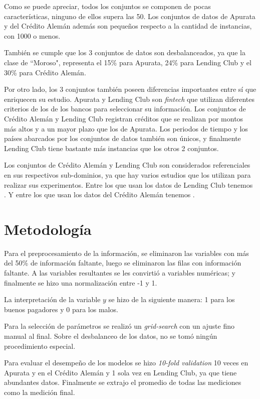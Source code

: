 Como se puede apreciar, todos los conjuntos se componen de pocas características, ninguno de ellos supera las 50. Los conjuntos de datos de Apurata y del Crédito Alemán además son pequeños respecto a la cantidad de instancias, con 1000 o menos.

También se cumple que los 3 conjuntos de datos son desbalanceados, ya que la clase de ``Moroso", representa el 15\% para Apurata, 24\% para Lending Club y el 30\% para Crédito Alemán.

Por otro lado, los 3 conjuntos también poseen diferencias importantes entre sí que enriquecen su estudio. Apurata y Lending Club son \textit{fintech} que utilizan diferentes criterios de los de los bancos para seleccionar su información. Los conjuntos de Crédito Alemán y Lending Club registran créditos que se realizan por montos más altos y a un mayor plazo que los de Apurata. Los periodos de tiempo y los países abarcados por los conjuntos de datos también son únicos, y finalmente Lending Club tiene bastante más instancias que los otros 2 conjuntos.

Los conjuntos de Crédito Alemán y Lending Club son considerados referenciales en sus respectivos sub-dominios, ya que hay varios estudios que los utilizan para realizar sus experimentos. Entre los que usan los datos de Lending Club tenemos \citep{malekipirbazari2015risk, zhang2016research, zang2014credit, tan2018deep}. Y entre los que usan los datos del Crédito Alemán tenemos \citep{harris2015credit, nanni2009experimental, brown2012experimental, wang2012two}.

\section{Metodología}

Para el preprocesamiento de la información, se eliminaron las variables con más del 50\% de información faltante, luego se eliminaron las filas con información faltante. A las variables resultantes se les convirtió a variables numéricas; y finalmente se hizo una normalización entre -1 y 1.

La interpretación de la variable $y$ se hizo de la siguiente manera: 1 para los buenos pagadores y 0 para los malos.

Para la selección de parámetros se realizó un \textit{grid-search} con un ajuste fino manual al final. Sobre el desbalanceo de los datos, no se tomó ningún procedimiento especial.

Para evaluar el desempeño de los modelos se hizo \textit{10-fold validation} 10 veces en Apurata y en el Crédito Alemán y 1 sola vez en Lending Club, ya que tiene abundantes datos. Finalmente se extrajo el promedio de todas las mediciones como la medición final.

